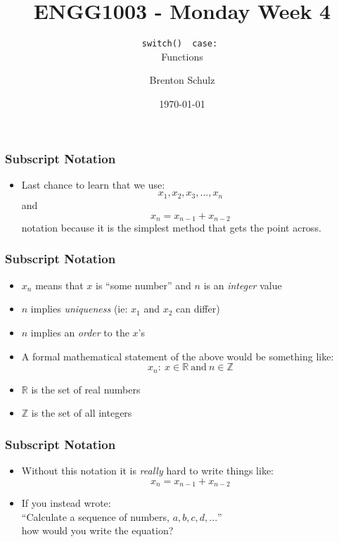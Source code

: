 \documentclass[14pt]{beamer}
\title{ENGG1003 - Monday Week 4}
\subtitle{\texttt{switch() { case: }} \\ Functions}
\author{Brenton Schulz}
\institute{University of Newcastle}
\date{\today}
\begin{document}
\titlepage

\begin{frame}
\frametitle{Subscript Notation}
\begin{itemize}
\item Last chance to learn that we use:
\begin{equation}
x_1, x_2, x_3, ... , x_n
\end{equation}
and
\begin{equation}
x_n = x_{n-1} + x_{n-2}
\end{equation}
notation because it is the simplest method that gets the point across.
\end{itemize}
\end{frame}

\begin{frame}[fragile]
\frametitle{Subscript Notation}
\begin{itemize}
\item $x_n$ means that $x$ is ``some number'' and $n$ is an \textit{integer} value
\item $n$ implies \textit{uniqueness} (ie: $x_1$ and $x_2$ can differ)
\item $n$ implies an \textit{order} to the $x$'s
\item A formal mathematical statement of the above would be something like:
\begin{equation}
x_n :~x \in \mathbb{R}~\textrm{and} ~ n \in \mathbb{Z}
\end{equation}
\item $\mathbb{R}$ is the set of real numbers
\item $\mathbb{Z}$ is the set of all integers
\end{itemize}
\end{frame}

\begin{frame}[fragile]
\frametitle{Subscript Notation}
\begin{itemize}
\item Without this notation it is \textit{really} hard to write things like:
\begin{equation}
x_n = x_{n-1} + x_{n-2}
\end{equation}
\pause
\item If you instead wrote:\\
``Calculate a sequence of numbers, $a,b,c,d,...$''\\
how would you write the equation?
\end{itemize}
\end{frame}
\end{document}
